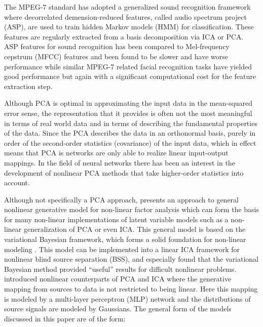 The MPEG-7 standard\cite{Casey2001} has adopted a generalized sound recognition framework where decorrelated demension-reduced features, called audio spectrum project (ASP), are used to train hidden Markov models (HMM) for classification\cite{Kim2006}. These features are regularly extracted from a basis decomposition via ICA or PCA\cite{Casey2001}\cite{Kim2003}\cite{Kim2006}. ASP features for sound recognition has been compared to Mel-frequency cepstrum (MFCC) features and been found to be slower and have worse performance\cite{Kim2004} while similar MPEG-7 related facial recognition tasks have yielded good performance but again with a significant computational cost for the feature extraction step\cite{Zaeri2006}.

Although PCA is optimal in approximating the input data in the mean-squared error sense, the representation that it provides is often not the most meaningful in terms of real world data and in terms of describing the fundamental properties of the data. Since the PCA describes the data in an orthonormal basis, purely in order of the second-order statistics (covariance) of the input data\citep{Oja1995}, which in effect means that PCA is networks are only able to realize linear input-output mappings\citep{Karhunen1995}. In the field of neural networks there has been an interest in the development of nonlinear PCA methods that take higher-order statistics into account.

Although not specifically a PCA approach, \cite{Honkela2005} presents an approach to general nonlinear generative model for non-linear factor analysis which can form the basis for many non-linear implementations of latent variable models such as a non-linear generalization of PCA or even ICA. This general model is based on the variational Bayesian framework, which forms a solid foundation for non-linear modeling \citep{Honkela2005}. This model can be implemented into a linear ICA framework for nonlinear blind source separation (BSS), and especially \cite{Valpola2003} found that the variational Bayesian method provided ``useful'' results for difficult nonlinear problems. \citep{Lappalainen2000} introduced nonlinear counterparts of PCA and ICA where the generative mapping from sources to data is not restricted to being linear. Here this mapping is modeled by a multi-layer perceptron (MLP) network and the distributions of source signals are modeled by Gaussians. The general form of the models discussed in this paper are of the form:

